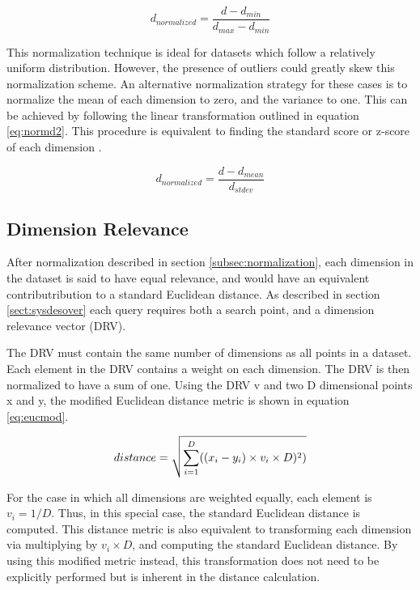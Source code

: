 \begin{equation}
\label{eq:normd}
d_{normalized} = \dfrac{d-d_{min}}{ d_{max} - d_{min} }
\end{equation}

This normalization technique is ideal for datasets which follow a relatively uniform distribution.  However, the presence of outliers could greatly skew this normalization scheme.  An alternative normalization strategy for these cases is to normalize the mean of each dimension to zero, and the variance to one.  This can be achieved by following the linear transformation outlined in equation \ref{eq:normd2}.  This procedure is equivalent to finding the standard score or z-score of each dimension \citep{cheadle2003analysis}.

\begin{equation}
\label{eq:normd2}
d_{normalized} = \dfrac{d-d_{mean}}{ d_{stdev} }
\end{equation}

\subsection{Dimension Relevance}
\label{subsec:dimrel}

After normalization described in section \ref{subsec:normalization}, each dimension in the dataset is said to have equal relevance, and would have an equivalent contributribution to a standard Euclidean distance.  As described in section \ref{sect:sysdesover} each query requires both a search point, and a dimension relevance vector (DRV).

The DRV must contain the same number of dimensions as all points in a dataset.  Each element in the DRV contains a weight on each dimension.  The DRV is then normalized to have a sum of one.  Using the DRV v and two D dimensional points x and y, the modified Euclidean distance metric is shown in equation \ref{eq:eucmod}.

\begin{equation}
\label{eq:eucmod}
distance = \sqrt{\sum\limits_{i=1}^D ((x_i - y_i) \times v_i \times D)^2)} \\
\end{equation}

For the case in which all dimensions are weighted equally, each element is $v_i=1/D$.  Thus, in this special case, the standard Euclidean distance is computed.  This distance metric is also equivalent to transforming each dimension via multiplying by $v_i \times D$, and computing the standard Euclidean distance.  By using this modified metric instead, this transformation does not need to be explicitly performed but is inherent in the distance calculation.

